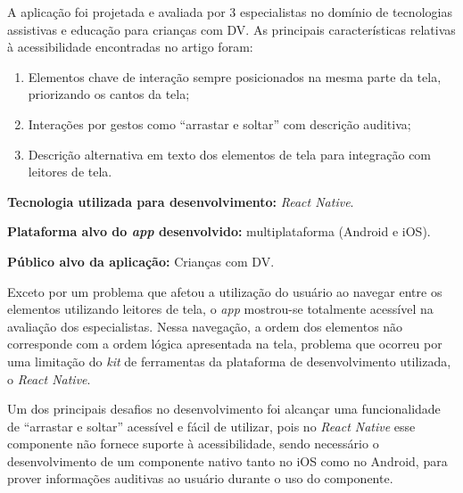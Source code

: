 A aplicação foi projetada e avaliada por 3 especialistas no domínio de tecnologias assistivas e educação
para crianças com DV\@. As principais características relativas à acessibilidade encontradas no artigo foram:

\begin{enumerate}
    \item Elementos chave de interação sempre posicionados na mesma parte da tela, priorizando os cantos da tela;
    \item Interações por gestos como ``arrastar e soltar'' com descrição auditiva;
    \item Descrição alternativa em texto dos elementos de tela para integração com leitores de tela.
\end{enumerate}

\textbf{Tecnologia utilizada para desenvolvimento:} \emph{React Native}.

\textbf{Plataforma alvo do \emph{app} desenvolvido:} multiplataforma (Android e iOS).

\textbf{Público alvo da aplicação:} Crianças com DV\@.

Exceto por um problema que afetou a utilização do usuário ao navegar entre os elementos utilizando leitores de tela, o \emph{app}
mostrou-se totalmente acessível na avaliação dos especialistas. Nessa navegação, a ordem dos elementos não corresponde com a ordem
lógica apresentada na tela, problema que ocorreu por uma limitação do \emph{kit} de ferramentas da plataforma de desenvolvimento
utilizada, o \emph{React Native}.

Um dos principais desafios no desenvolvimento foi alcançar uma funcionalidade de ``arrastar e soltar'' acessível e fácil de utilizar,
pois no \emph{React Native} esse componente não fornece suporte à acessibilidade, sendo necessário o desenvolvimento de um componente
nativo tanto no iOS como no Android, para prover informações auditivas ao usuário durante o uso do componente.
